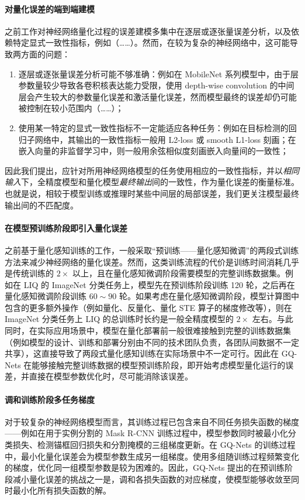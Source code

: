 \paragraph{对量化误差的端到端建模}
之前工作对神经网络量化过程的误差建模多集中在逐层或逐张量误差分析，以及依赖特定显式一致性指标，例如（……）。然而，在较为复杂的神经网络中，这可能导致两方面的问题：
\begin{enumerate}[1)]
  \item 逐层或逐张量误差分析可能不够准确：例如在 MobileNet 系列模型中，由于层参数量较少导致各卷积核表达能力受限，使用 depth-wise convolution 的中间层会产生较大的参数量化误差和激活量化误差，然而模型最终的误差却仍可能被控制在较小范围内（……）；
  \item 使用某一特定的显式一致性指标不一定能适应各种任务：例如在目标检测的回归子网络中，其输出的一致性指标一般用 L2-loss 或 smooth L1-loss 刻画；在嵌入向量的非监督学习中，则一般用余弦相似度刻画嵌入向量间的一致性；
\end{enumerate}
因此我们提出，应针对所用神经网络模型的任务使用相应的一致性指标，并以\emph{相同输入}下，全精度模型和量化模型\emph{最终输出}间的一致性，作为量化误差的衡量标准。也就是说，相较于模型训练或推理时某些中间层的局部误差，我们更关注模型最终输出间的不匹配度。

\paragraph{在模型预训练阶段即引入量化误差}
之前基于量化感知训练的工作，一般采取“预训练——量化感知微调”的两段式训练方法来减少神经网络的量化误差。然而，这类训练流程的代价是训练时间消耗几乎是传统训练的 $2\times$ 以上，且在量化感知微调阶段需要模型的完整训练数据集。例如在 LIQ 的 ImageNet 分类任务上，模型先在预训练阶段训练 120 轮，之后再在量化感知微调阶段训练 $60\sim 90$ 轮。如果考虑在量化感知微调阶段，模型计算图中包含的更多额外操作（例如量化、反量化、量化 STE 算子的梯度修改等），则在 ImageNet 分类任务上 LIQ 的总训练时长约是一般全精度模型的 $2\times$ 左右。与此同时，在实际应用场景中，模型在量化部署前一般很难接触到完整的训练数据集（例如模型的设计、训练和部署分别由不同的技术团队负责，各团队间数据不一定共享），这直接导致了两段式量化感知训练在实际场景中不一定可行。因此在 GQ-Nets 在能够接触完整训练数据的模型预训练阶段，即开始考虑模型量化运行的误差，并直接在模型参数优化时，尽可能消除该误差。

\paragraph{调和训练阶段多任务梯度}
对于较复杂的神经网络模型而言，其训练过程已包含来自不同任务损失函数的梯度——例如在用于实例分割的 Mask R-CNN 训练过程中，模型参数同时被最小化分类损失、检测锚框回归损失和分割掩模的三组梯度更新。在 GQ-Nets 的训练过程中，最小化量化误差会为模型参数生成另一组梯度。使用多组随训练过程频繁变化的梯度，优化同一组模型参数是较为困难的。因此，GQ-Nets 提出的在预训练阶段减小量化误差的挑战之一是，调和各损失函数的对应梯度，使模型能够收敛至同时最小化所有损失函数的解。
